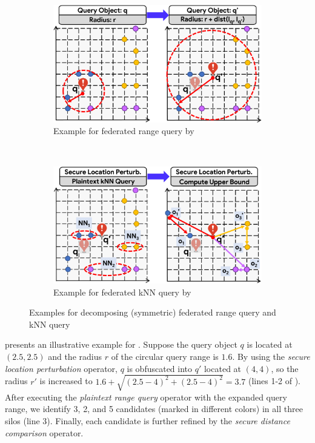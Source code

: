 \begin{figure}[t]
    \centering
    \begin{subfigure}{0.45\textwidth}
        \centering
        \includegraphics[width=\linewidth]{fed-rq-perturb.pdf}
        \caption{Example for federated range query by }
		\label{fig:exp-rq-perturb}
   \end{subfigure}
   ~~~
   \begin{subfigure}{0.45\textwidth}
        \centering
        \includegraphics[width=\linewidth]{fed-knn-perturb.pdf}
        \caption{Example for federated kNN query by }
		\label{fig:exp-knn-perturb}
    \end{subfigure}
    \caption{Examples for decomposing (symmetric) federated range query and kNN query}
    \label{fig:exp-perturb}
\end{figure}

\begin{example}
     presents an illustrative example for .
    Suppose the query object $q$ is located at $(2.5, 2.5)$ and the radius $r$ of the circular query range is $1.6$.
    By using the \textit{secure location perturbation} operator, $q$ is obfuscated into $q'$ located at $(4, 4)$, so the radius $r'$ is increased to $1.6 + \sqrt{(2.5-4)^2+(2.5-4)^2} = 3.7$ (lines 1-2 of ).
    After executing the \textit{plaintext range query} operator with the expanded query range, we identify 3, 2, and 5 candidates (marked in different colors) in all three silos (line 3).
    Finally, each candidate is further refined by the \textit{secure distance comparison} operator.
\end{example}

